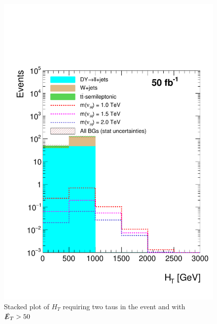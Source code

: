 \begin{figure}[H]
\centering
\includegraphics[width=\linewidth]{StackPlots/HT_2taus_met50_50ifb.pdf}
\caption{Stacked plot of $H_{T}$ requiring two taus in the event and with $\slashed{E}_{T} > 50$}
\label{fig: HT2tausMet50}
\end{figure}

